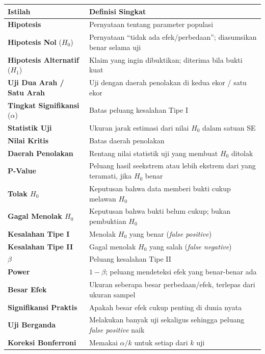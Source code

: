 \documentclass[
  indonesian,
  letterpaper,
]{book}
\newcounter{none} %
\begin{document}
{\def\LTcaptype{none} %
\begin{longtable}[]{@{}
  >{\raggedright\arraybackslash}p{}
  >{\raggedright\arraybackslash}p{}@{}}
\toprule\noalign{}
\begin{minipage}[b]{\linewidth}\raggedright
Istilah
\end{minipage} & \begin{minipage}[b]{\linewidth}\raggedright
Definisi Singkat
\end{minipage} \\
\midrule\noalign{}
\endhead
\bottomrule\noalign{}
\endlastfoot
\textbf{Hipotesis} & Pernyataan tentang parameter populasi \\
\textbf{Hipotesis Nol} (\(H_0\)) & Pernyataan ``tidak ada
efek/perbedaan''; diasumsikan benar selama uji \\
\textbf{Hipotesis Alternatif} (\(H_1\)) & Klaim yang ingin dibuktikan;
diterima bila bukti kuat \\
\textbf{Uji Dua Arah / Satu Arah} & Uji dengan daerah penolakan di kedua
ekor / satu ekor \\
\textbf{Tingkat Signifikansi} (\(\alpha\)) & Batas peluang kesalahan
Tipe I \\
\textbf{Statistik Uji} & Ukuran jarak estimasi dari nilai \(H_0\) dalam
satuan SE \\
\textbf{Nilai Kritis} & Batas daerah penolakan \\
\textbf{Daerah Penolakan} & Rentang nilai statistik uji yang membuat
\(H_0\) ditolak \\
\textbf{P-Value} & Peluang hasil seekstrem atau lebih ekstrem dari yang
teramati, jika \(H_0\) benar \\
\textbf{Tolak \(H_0\)} & Keputusan bahwa data memberi bukti cukup
melawan \(H_0\) \\
\textbf{Gagal Menolak \(H_0\)} & Keputusan bahwa bukti belum cukup;
bukan pembuktian \(H_0\) \\
\textbf{Kesalahan Tipe I} & Menolak \(H_0\) yang benar (\emph{false
positive}) \\
\textbf{Kesalahan Tipe II} & Gagal menolak \(H_0\) yang salah
(\emph{false negative}) \\
\(\beta\) & Peluang kesalahan Tipe II \\
\textbf{Power} & \(1 - \beta\); peluang mendeteksi efek yang benar-benar
ada \\
\textbf{Besar Efek} & Ukuran seberapa besar perbedaan/efek, terlepas
dari ukuran sampel \\
\textbf{Signifikansi Praktis} & Apakah besar efek cukup penting di dunia
nyata \\
\textbf{Uji Berganda} & Melakukan banyak uji sekaligus sehingga peluang
\emph{false positive} naik \\
\textbf{Koreksi Bonferroni} & Memakai \(\alpha/k\) untuk setiap dari
\(k\) uji \\
\end{longtable}
}
\end{document}
